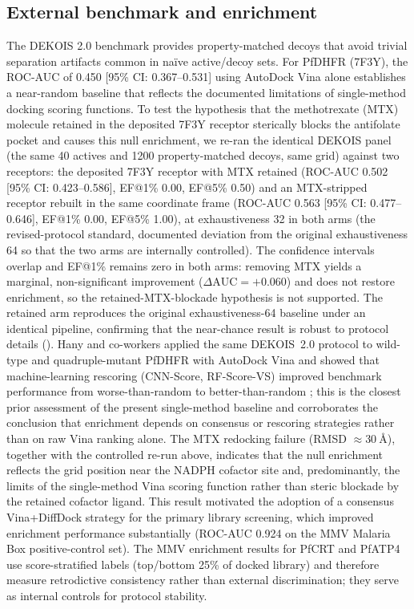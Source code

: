 \documentclass[journal=jcisd8,manuscript=suppinfo]{achemso}
\begin{document}
\subsection{External benchmark and enrichment}\label{sec:sm_val_dekois}


The DEKOIS 2.0 benchmark \cite{Bauer2013} provides property-matched decoys that avoid trivial separation artifacts common in na\"ive active/decoy sets. For PfDHFR (7F3Y), the ROC-AUC of 0.450 [95\% CI: 0.367--0.531] using AutoDock Vina alone establishes a near-random baseline that reflects the documented limitations of single-method docking scoring functions. To test the hypothesis that the methotrexate (MTX) molecule retained in the deposited 7F3Y receptor sterically blocks the antifolate pocket and causes this null enrichment, we re-ran the identical DEKOIS panel (the same 40 actives and 1200 property-matched decoys, same grid) against two receptors: the deposited 7F3Y receptor with MTX retained (ROC-AUC 0.502 [95\% CI: 0.423--0.586], EF@1\% 0.00, EF@5\% 0.50) and an MTX-stripped receptor rebuilt in the same coordinate frame (ROC-AUC 0.563 [95\% CI: 0.477--0.646], EF@1\% 0.00, EF@5\% 1.00), at exhaustiveness 32 in both arms (the revised-protocol standard, documented deviation from the original exhaustiveness 64 so that the two arms are internally controlled). The confidence intervals overlap and EF@1\% remains zero in both arms: removing MTX yields a marginal, non-significant improvement ($\Delta\mathrm{AUC} = +0.060$) and does not restore enrichment, so the retained-MTX-blockade hypothesis is not supported. The retained arm reproduces the original exhaustiveness-64 baseline under an identical pipeline, confirming that the near-chance result is robust to protocol details (). Hany and co-workers applied the same DEKOIS~2.0 protocol to wild-type and quadruple-mutant PfDHFR with AutoDock Vina and showed that machine-learning rescoring (CNN-Score, RF-Score-VS) improved benchmark performance from worse-than-random to better-than-random \cite{hany2025dekois}; this is the closest prior assessment of the present single-method baseline and corroborates the conclusion that enrichment depends on consensus or rescoring strategies rather than on raw Vina ranking alone. The MTX redocking failure (RMSD $\approx \SI{30}{\angstrom}$), together with the controlled re-run above, indicates that the null enrichment reflects the grid position near the NADPH cofactor site and, predominantly, the limits of the single-method Vina scoring function rather than steric blockade by the retained cofactor ligand. This result motivated the adoption of a consensus Vina+DiffDock strategy for the primary library screening, which improved enrichment performance substantially (ROC-AUC 0.924 on the MMV Malaria Box positive-control set). The MMV enrichment results for PfCRT and PfATP4 use score-stratified labels (top/bottom 25\% of docked library) and therefore measure retrodictive consistency rather than external discrimination; they serve as internal controls for protocol stability.
\end{document}

